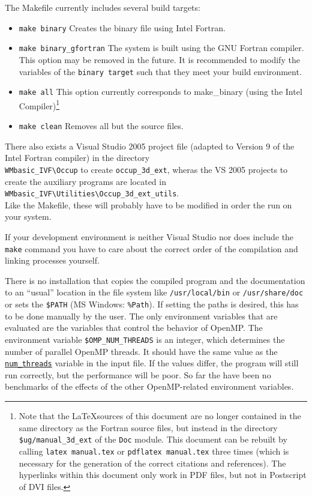 \documentclass[a4paper,10pt]{article}
\begin{document}
The Makefile currently includes several build targets:
\begin{itemize}
\item \texttt{make binary} Creates the binary file using Intel Fortran.
\item \texttt{make binary\_gfortran} The system is built  using the GNU Fortran 
compiler. This option may be removed in the future. It is recommended to modify 
the variables of the \texttt{binary target} such that they meet your build 
environment.\item \texttt{make all} This option currently corresponds to 
make\_binary (using the Intel Compiler)\footnote{Note that the \LaTeX sources of 
this document are no longer contained in the same directory as
the Fortran source files, but instead in the directory 
\texttt{\$ug/manual\_3d\_ext} of the \texttt{Doc} module. This document can
be rebuilt by calling
\texttt{latex manual.tex}
or 
\texttt{pdflatex manual.tex}
three times (which is necessary for the generation of the correct citations and 
references). The hyperlinks within this document only work in PDF files, but not 
in Postscript of DVI files.} \item \texttt{make clean} Removes all but the 
source files.
\end{itemize}

There also exists a Visual Studio 2005 project file (adapted to Version 9 of  
the Intel Fortran compiler) in the directory\\
\texttt{WMbasic\_IVF\textbackslash Occup}
to create \texttt{occup\_3d\_ext},
 wheras the VS 2005 projects to create the auxiliary programs are
located in\\
\texttt{WMbasic\_IVF\textbackslash Utilities\textbackslash Occup\_3d\_ext\_utils}.\\
Like the Makefile, these will probably have to be modified in order the run on 	
your system.

If your development environment is neither Visual Studio nor does  include the 
\texttt{make} command  you have to 
care about the correct order of the compilation and linking processes yourself.

There is no installation that copies the compiled program and the documentation  
to an ``usual'' location in the file system like \texttt{/usr/local/bin} or 
\texttt{/usr/share/doc} or sets the \texttt{\$PATH} (MS Windows: 
\texttt{\%Path}). If setting the paths is desired, this has to be done manually 
by the user. The only environment variables  that are evaluated are the 
variables that control the behavior of OpenMP. The environment variable 
\texttt{\$OMP\_NUM\_THREADS} is an integer, which determines the number of 
parallel OpenMP threads. It should have the same value as the 
\texttt{\hyperref[opt:numthreads]{num\_threads}} variable in the input file. 
If the values differ, the program will still run correctly, but the performance 
will be poor. So far the have been no benchmarks of the effects of the other 
OpenMP-related environment variables.   
\end{document}
